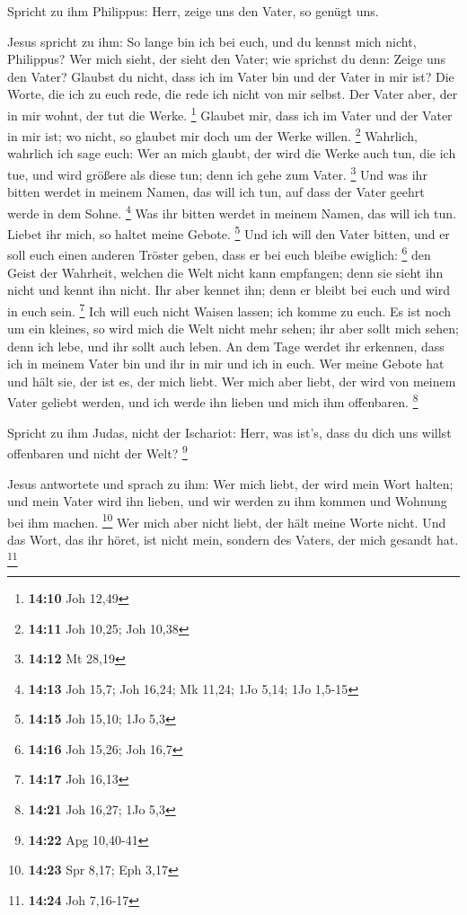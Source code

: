  Spricht zu ihm Philippus: Herr, zeige uns den Vater, so
genügt uns.

 Jesus spricht zu ihm: So lange bin ich bei euch, und du
kennst mich nicht, Philippus? Wer mich sieht, der sieht den Vater; wie
sprichst du denn: Zeige uns den Vater?  Glaubst du nicht,
dass ich im Vater bin und der Vater in mir ist? Die Worte, die ich zu
euch rede, die rede ich nicht von mir selbst. Der Vater aber, der in mir
wohnt, der tut die Werke. \footnote{\textbf{14:10} Joh 12,49}
 Glaubet mir, dass ich im Vater und der Vater in mir ist;
wo nicht, so glaubet mir doch um der Werke willen. \footnote{\textbf{14:11}
  Joh 10,25; Joh 10,38}  Wahrlich, wahrlich ich sage euch:
Wer an mich glaubt, der wird die Werke auch tun, die ich tue, und wird
größere als diese tun; denn ich gehe zum Vater. \footnote{\textbf{14:12}
  Mt 28,19}  Und was ihr bitten werdet in meinem Namen, das
will ich tun, auf dass der Vater geehrt werde in dem Sohne. \footnote{\textbf{14:13}
  Joh 15,7; Joh 16,24; Mk 11,24; 1Jo 5,14; 1Jo 1,5-15}  Was
ihr bitten werdet in meinem Namen, das will ich tun. 
Liebet ihr mich, so haltet meine Gebote. \footnote{\textbf{14:15} Joh
  15,10; 1Jo 5,3}  Und ich will den Vater bitten, und er
soll euch einen anderen Tröster geben, dass er bei euch bleibe ewiglich:
\footnote{\textbf{14:16} Joh 15,26; Joh 16,7}  den Geist
der Wahrheit, welchen die Welt nicht kann empfangen; denn sie sieht ihn
nicht und kennt ihn nicht. Ihr aber kennet ihn; denn er bleibt bei euch
und wird in euch sein. \footnote{\textbf{14:17} Joh 16,13} 
Ich will euch nicht Waisen lassen; ich komme zu euch.  Es
ist noch um ein kleines, so wird mich die Welt nicht mehr sehen; ihr
aber sollt mich sehen; denn ich lebe, und ihr sollt auch leben.
 An dem Tage werdet ihr erkennen, dass ich in meinem Vater
bin und ihr in mir und ich in euch.  Wer meine Gebote hat
und hält sie, der ist es, der mich liebt. Wer mich aber liebt, der wird
von meinem Vater geliebt werden, und ich werde ihn lieben und mich ihm
offenbaren. \footnote{\textbf{14:21} Joh 16,27; 1Jo 5,3}

 Spricht zu ihm Judas, nicht der Ischariot: Herr, was
ist's, dass du dich uns willst offenbaren und nicht der Welt?
\footnote{\textbf{14:22} Apg 10,40-41}

 Jesus antwortete und sprach zu ihm: Wer mich liebt, der
wird mein Wort halten; und mein Vater wird ihn lieben, und wir werden zu
ihm kommen und Wohnung bei ihm machen. \footnote{\textbf{14:23} Spr
  8,17; Eph 3,17}  Wer mich aber nicht liebt, der hält
meine Worte nicht. Und das Wort, das ihr höret, ist nicht mein, sondern
des Vaters, der mich gesandt hat. \footnote{\textbf{14:24} Joh 7,16-17}


